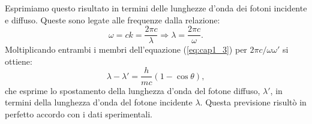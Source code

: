\begin{center}
\end{center}

Esprimiamo questo risultato in termini delle lunghezze d'onda dei fotoni incidente e diffuso. Queste sono legate alle frequenze dalla relazione:
	\begin{equation}
		\omega = c k =\frac{2 \pi c}{\lambda} \Rightarrow \boxed{\lambda =\frac{2 \pi c}{\omega}.}
	\end{equation}
Moltiplicando entrambi i membri dell'equazione (\ref{eq:cap1_3}) per $2 \pi c / \omega \omega '$ si ottiene:
	\begin{equation}
		\boxed{\boxed{
			\lambda - \lambda ' =\frac{h}{mc}\left( 1-\cos \theta \right),
			}}
	\end{equation}
che esprime lo spostamento della lunghezza d'onda del fotone diffuso, $\lambda ' $, in termini della lunghezza d'onda del fotone incidente $\lambda$. Questa previsione risultò in perfetto accordo con i dati sperimentali.\\

